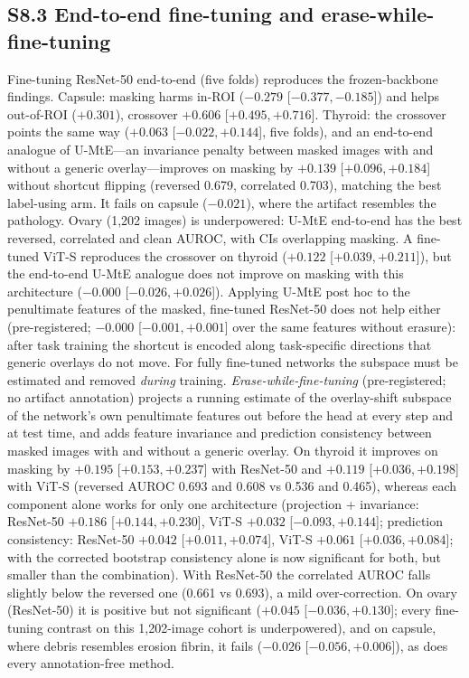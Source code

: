 \subsection*{S8.3 End-to-end fine-tuning and erase-while-fine-tuning}
Fine-tuning ResNet-50 end-to-end (five folds) reproduces the frozen-backbone findings. Capsule: masking harms
in-ROI ($-0.279$ [$-0.377, -0.185$]) and helps out-of-ROI ($+0.301$), crossover $+0.606$ [$+0.495, +0.716$].
Thyroid: the crossover points the same way ($+0.063$ [$-0.022, +0.144$], five folds), and an end-to-end analogue of
U-MtE---an invariance penalty between masked images with and without a generic overlay---improves on masking by
$+0.139$ [$+0.096, +0.184$] without shortcut flipping (reversed 0.679, correlated 0.703), matching the best
label-using arm. It fails on capsule ($-0.021$), where the artifact resembles the pathology. Ovary (1,202 images)
is underpowered: U-MtE end-to-end has the best reversed, correlated and clean AUROC, with CIs overlapping masking.
A fine-tuned ViT-S reproduces the crossover on thyroid ($+0.122$ [$+0.039, +0.211$]), but the end-to-end U-MtE
analogue does not improve on masking with this architecture ($-0.000$ [$-0.026, +0.026$]). Applying U-MtE post hoc to
the penultimate features of the masked, fine-tuned ResNet-50 does not help either (pre-registered; $-0.000$
[$-0.001, +0.001$] over the same features without erasure): after task training the shortcut is encoded along
task-specific directions that generic overlays do not move. For fully fine-tuned networks the subspace must be
estimated and removed \emph{during} training. \emph{Erase-while-fine-tuning} (pre-registered; no artifact annotation)
projects a running estimate of the overlay-shift subspace of the network's own penultimate features out before the
head at every step and at test time, and adds feature invariance and prediction consistency between masked images with
and without a generic overlay. On thyroid it improves on masking by $+0.195$ [$+0.153, +0.237$] with ResNet-50 and
$+0.119$ [$+0.036, +0.198$] with ViT-S (reversed AUROC 0.693 and 0.608 vs 0.536 and 0.465), whereas each component
alone works for only one architecture (projection + invariance: ResNet-50 $+0.186$ [$+0.144, +0.230$], ViT-S $+0.032$
[$-0.093, +0.144$]; prediction consistency: ResNet-50 $+0.042$ [$+0.011, +0.074$], ViT-S $+0.061$ [$+0.036, +0.084$]; with the corrected
bootstrap consistency alone is now significant for both, but smaller than the combination).
With ResNet-50 the correlated AUROC falls slightly below the reversed one (0.661 vs 0.693), a mild over-correction.
On ovary (ResNet-50) it is positive but not significant ($+0.045$ [$-0.036, +0.130$]; every fine-tuning contrast on this
1,202-image cohort is underpowered), and on capsule, where debris resembles erosion fibrin, it fails ($-0.026$
[$-0.056, +0.006$]), as does every annotation-free method.

